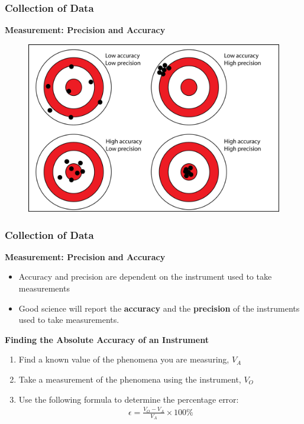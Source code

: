 \documentclass{beamer}
\begin{document}
\begin{frame}
\frametitle{Collection of Data}
\textbf{Measurement: Precision and Accuracy}\\
\vspace{0.5cm}
\begin{figure}
\includegraphics[scale=0.5]{precision_accuracy}
\end{figure}
\end{frame}


\begin{frame}[fragile]
\frametitle{Collection of Data}
\textbf{Measurement: Precision and Accuracy}\\
\vspace{0.1cm}
\begin{itemize}
\item Accuracy and precision are dependent on the instrument used to take measurements
\vspace{0.1cm}
\item Good science will report the \textbf{accuracy} and the \textbf{precision} of the instruments used to take measurements.
\vspace{0.1cm}
\end{itemize}
\begin{tcolorbox}
\textbf{Finding the Absolute Accuracy of an Instrument}
\begin{enumerate}
\item Find a known value of the phenomena you are measuring, $V_A$
\item Take a measurement of the phenomena using the instrument, $V_O$
\item Use the following formula to determine the percentage error:
\begin{align*}
\epsilon = \frac{V_O - V_A}{V_A} \times 100\%
\end{align*}
\end{enumerate}
\end{tcolorbox}
\end{frame}
\end{document}
